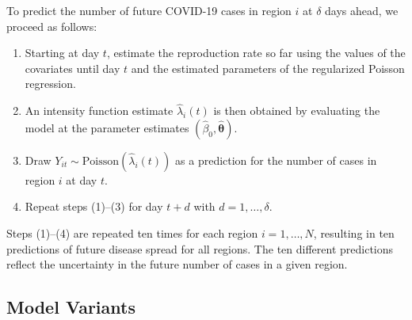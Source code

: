 \documentclass[sigconf, review = false, nonacm = true]{acmart}
\begin{document}
To predict the number of future COVID-19 cases in region $i$ at $\delta$ days ahead, we proceed as follows: 
\begin{enumerate}
    \item Starting at day $t$, estimate the reproduction rate so far using the values of the covariates until day $t$ and the estimated parameters of the regularized Poisson regression.
    \item An intensity function estimate $\hat \lambda_i(t)$ is then obtained by evaluating the model at the parameter estimates $(\hat \beta_0, \hat{\bm \theta})$.
    \item Draw $Y_{it} \sim\text{Poisson}(\hat \lambda_i(t))$ as a prediction for the number of cases in region $i$ at day $t$.
    \item Repeat steps (1)--(3) for day $t+d$ with $d=1,\ldots,\delta$.
\end{enumerate}
Steps (1)--(4) are repeated ten times for each region $i=1,\ldots,N$, resulting in ten predictions of future disease spread for all regions. The ten different predictions reflect the uncertainty in the future number of cases in a given region. 

\subsection{Model Variants}
\label{sec:model_variants}
\end{document}
